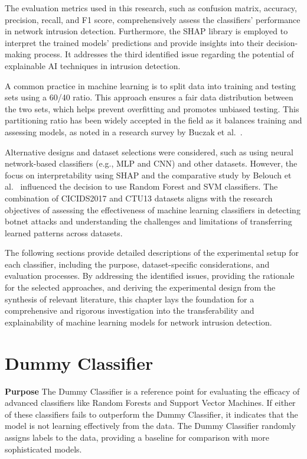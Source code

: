The evaluation metrics used in this research, such as confusion matrix, accuracy, precision, recall, and F1 score, comprehensively assess the classifiers' performance in network intrusion detection. Furthermore, the SHAP library is employed to interpret the trained models' predictions and provide insights into their decision-making process. It addresses the third identified issue regarding the potential of explainable AI techniques in intrusion detection.

A common practice in machine learning is to split data into training and testing sets using a 60/40 ratio. This approach ensures a fair data distribution between the two sets, which helps prevent overfitting and promotes unbiased testing. This partitioning ratio has been widely accepted in the field as it balances training and assessing models, as noted in a research survey by Buczak et al.~\cite{buczak2015survey}.

Alternative designs and dataset selections were considered, such as using neural network-based classifiers (e.g., MLP and CNN) and other datasets. However, the focus on interpretability using SHAP and the comparative study by Belouch et al.~\cite{belouch2018performance} influenced the decision to use Random Forest and SVM classifiers. The combination of CICIDS2017 and CTU13 datasets aligns with the research objectives of assessing the effectiveness of machine learning classifiers in detecting botnet attacks and understanding the challenges and limitations of transferring learned patterns across datasets.

The following sections provide detailed descriptions of the experimental setup for each classifier, including the purpose, dataset-specific considerations, and evaluation processes. By addressing the identified issues, providing the rationale for the selected approaches, and deriving the experimental design from the synthesis of relevant literature, this chapter lays the foundation for a comprehensive and rigorous investigation into the transferability and explainability of machine learning models for network intrusion detection.

\section{Dummy Classifier}\label{sec:DummyClassifier}

\textbf{Purpose} The Dummy Classifier is a reference point for evaluating the efficacy of advanced classifiers like Random Forests and Support Vector Machines. If either of these classifiers fails to outperform the Dummy Classifier, it indicates that the model is not learning effectively from the data. The Dummy Classifier randomly assigns labels to the data, providing a baseline for comparison with more sophisticated models.

